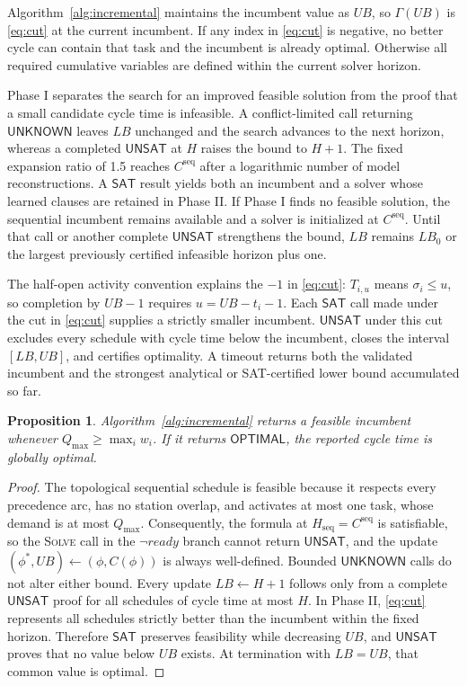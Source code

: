 \documentclass[]{interact}
\theoremstyle{plain}
\newtheorem{proposition}[theorem]{Proposition}
\theoremstyle{definition}
\theoremstyle{remark}
\newcommand{\Qmax}{Q_{\max}}
\newcommand{\LBzero}{\ensuremath{LB_0}}
\newcommand{\Status}[1]{\ensuremath{\mathsf{#1}}}
\begin{document}
Algorithm~\ref{alg:incremental} maintains the incumbent value as $UB$, so $\Gamma(UB)$ is \eqref{eq:cut} at the current incumbent. If any index in \eqref{eq:cut} is negative, no better cycle can contain that task and the incumbent is already optimal. Otherwise all required cumulative variables are defined within the current solver horizon.

Phase I separates the search for an improved feasible solution from the proof that a small candidate cycle time is infeasible. A conflict-limited call returning \Status{UNKNOWN} leaves $LB$ unchanged and the search advances to the next horizon, whereas a completed \Status{UNSAT} at $H$ raises the bound to $H+1$. The fixed expansion ratio of 1.5 reaches $C^{\mathrm{seq}}$ after a logarithmic number of model reconstructions. A \Status{SAT} result yields both an incumbent and a solver whose learned clauses are retained in Phase II. If Phase I finds no feasible solution, the sequential incumbent remains available and a solver is initialized at $C^{\mathrm{seq}}$. Until that call or another complete \Status{UNSAT} strengthens the bound, $LB$ remains $\LBzero$ or the largest previously certified infeasible horizon plus one.

The half-open activity convention explains the $-1$ in \eqref{eq:cut}: $T_{i,u}$ means $\sigma_i\leq u$, so completion by $UB-1$ requires $u=UB-t_i-1$. Each \Status{SAT} call made under the cut in \eqref{eq:cut} supplies a strictly smaller incumbent. \Status{UNSAT} under this cut excludes every schedule with cycle time below the incumbent, closes the interval $[LB,UB]$, and certifies optimality. A timeout returns both the validated incumbent and the strongest analytical or SAT-certified lower bound accumulated so far.

\begin{proposition}
Algorithm~\ref{alg:incremental} returns a feasible incumbent whenever $\Qmax\geq\max_i w_i$. If it returns \Status{OPTIMAL}, the reported cycle time is globally optimal.
\end{proposition}

\begin{proof}
The topological sequential schedule is feasible because it respects every precedence arc, has no station overlap, and activates at most one task, whose demand is at most $\Qmax$. Consequently, the formula at $H_{\mathrm{seq}}=C^{\mathrm{seq}}$ is satisfiable, so the \textsc{Solve} call in the $\neg\mathit{ready}$ branch cannot return \Status{UNSAT}, and the update $(\phi^*,UB)\gets(\phi,C(\phi))$ is always well-defined. Bounded \Status{UNKNOWN} calls do not alter either bound. Every update $LB\gets H+1$ follows only from a complete \Status{UNSAT} proof for all schedules of cycle time at most $H$. In Phase II, \eqref{eq:cut} represents all schedules strictly better than the incumbent within the fixed horizon. Therefore \Status{SAT} preserves feasibility while decreasing $UB$, and \Status{UNSAT} proves that no value below $UB$ exists. At termination with $LB=UB$, that common value is optimal.
\end{proof}
\end{document}
